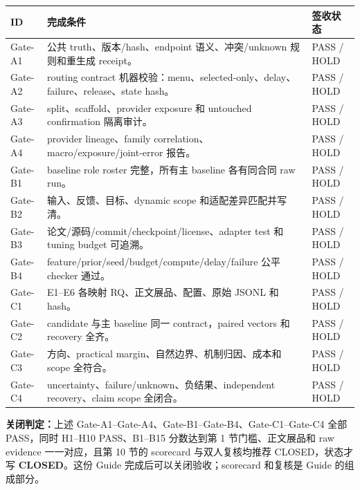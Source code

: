 \documentclass[10pt,letterpaper]{article}
\newcommand{\sect}[1]{\vspace{4pt}{\large\bfseries\color{GuideBlue}#1}\par\vspace{2pt}}
\newenvironment{clean}{\begin{center}\fontsize{8.55}{10.05}\selectfont\setlength{\tabcolsep}{3.7pt}\renewcommand{\arraystretch}{1.04}}{\end{center}}
\begin{document}
\sect{11. 完成后逐项签收}
\begin{clean}
\begin{tabular}{@{}p{.08\linewidth}p{.56\linewidth}p{.24\linewidth}@{}}
\toprule
ID & 完成条件 & 签收状态\\
\midrule
Gate-A1 & 公共 truth、版本/hash、endpoint 语义、冲突/unknown 规则和重生成 receipt。 & PASS / HOLD\\
Gate-A2 & routing contract 机器校验：menu、selected-only、delay、failure、release、state hash。 & PASS / HOLD\\
Gate-A3 & split、scaffold、provider exposure 和 untouched confirmation 隔离审计。 & PASS / HOLD\\
Gate-A4 & provider lineage、family correlation、macro/exposure/joint-error 报告。 & PASS / HOLD\\
Gate-B1 & baseline role roster 完整，所有主 baseline 各有同合同 raw run。 & PASS / HOLD\\
Gate-B2 & 输入、反馈、目标、dynamic scope 和适配差异匹配并写清。 & PASS / HOLD\\
Gate-B3 & 论文/源码/commit/checkpoint/license、adapter test 和 tuning budget 可追溯。 & PASS / HOLD\\
Gate-B4 & feature/prior/seed/budget/compute/delay/failure 公平 checker 通过。 & PASS / HOLD\\
Gate-C1 & E1--E6 各映射 RQ、正文展品、配置、原始 JSONL 和 hash。 & PASS / HOLD\\
Gate-C2 & candidate 与主 baseline 同一 contract，paired vectors 和 recovery 全齐。 & PASS / HOLD\\
Gate-C3 & 方向、practical margin、自然边界、机制归因、成本和 scope 全符合。 & PASS / HOLD\\
Gate-C4 & uncertainty、failure/unknown、负结果、independent recovery、claim scope 全闭合。 & PASS / HOLD\\
\bottomrule
\end{tabular}
\end{clean}
\textbf{关闭判定：}上述 Gate-A1--Gate-A4、Gate-B1--Gate-B4、Gate-C1--Gate-C4 全部 PASS，同时 H1--H10 PASS、B1--B15 分数达到第 1 节门槛、正文展品和 raw evidence 一一对应，且第 10 节的 scorecard 与双人复核均推荐 CLOSED，状态才写 \textbf{CLOSED}。这份 Guide 完成后可以关闭验收；scorecard 和复核是 Guide 的组成部分。
\end{document}

